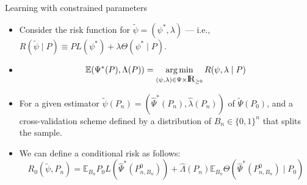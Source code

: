 \documentclass[12pt,t,handout]{beamer}
\newcommand{\E}{\mathbb{E}}
\DeclareMathOperator*{\argmin}{arg\,min}
\newcommand{\openr}{\hbox{${\rm I\kern-.2em R}$}}
\begin{document}
\begin{frame}[c]{Learning with constrained parameters}

\begin{center}
\begin{itemize}
  \itemsep12pt
  \item Consider the risk function for $\widetilde{\psi} = (\psi^*, \lambda)$
    --- i.e., $R(\tilde{\psi} \mid P) \equiv PL(\psi^*) + \lambda \Theta(\psi^*
    \mid P)$.
  \item $$\E(\Psi^*(P), \Lambda(P)) = \argmin_{(\psi, \lambda) \in \Psi
      \times \openr_{\geq 0}}R(\psi, \lambda \mid P)$$
  \item For a given estimator $\widetilde{\psi}(P_n) = (\hat{\Psi}^*(P_n),
    \hat{\lambda}(P_n))$ of $\widetilde{\Psi}(P_0)$, and a cross-validation
    scheme defined by a distribution of $B_n \in \{0, 1\}^n$ that splits the
    sample.
  \item We can define a conditional risk as follows:
    $$R_0(\widetilde{\psi}, P_n) = \E_{B_n} P_0L(\hat{\Psi}^*(P_{n, B_n}^0)) +
      \hat{\Lambda}(P_n) \E_{B_n} \Theta(\hat{\Psi}^*(P_{n, B_n}^0) \mid P_0)$$
\end{itemize}
\end{center}


\end{frame}

\end{document}
